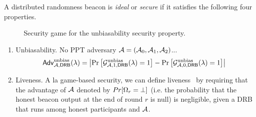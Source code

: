 \begin{definition}
A distributed randomness beacon is \textit{ideal} or \textit{secure} if it satisfies the following four properties.

\begin{figure}[h]
\begin{center}
\end{center}
\caption{Security game for the unbiasability security property.}
\end{figure}

\begin{enumerate}
\item Unbiasability. No PPT adversary $\mathcal{A} = (\mathcal{A}_0, \mathcal{A}_1, \mathcal{A}_2)$...
\begingroup\makeatletter\def\f@size{8}\check@mathfonts
\begin{equation*}
\mathsf{Adv}^\text{unbias}_{\mathcal{A}, \mathsf{DRB}}(\lambda) = \left|\Pr\left[\mathcal{G}^\text{unbias}_{\mathcal{A}, 1, \mathsf{DRB}}(\lambda) = 1\right] - \Pr\left[\mathcal{G}^\text{unbias}_{\mathcal{A}, 0, \mathsf{DRB}}(\lambda) = 1\right]\right|
\end{equation*}\endgroup
\item Liveness. A la game-based security, we can define liveness~\cite{guo2020secRand} by requiring that the advantage of $\mathcal{A}$ denoted by $Pr[\Omega_r = \text{$\perp$}]$ (i.e. the probability that the honest beacon output at the end of round $r$ is null) is negligible, given a DRB that runs among honest participants and $\mathcal{A}$.
\end{enumerate}
\end{definition}

